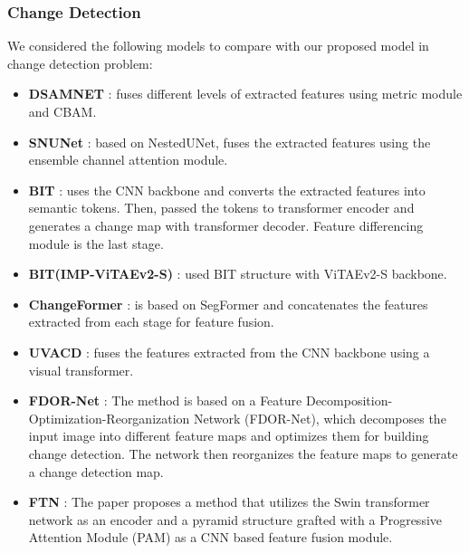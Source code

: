 \documentclass{article}
\begin{document}
\subsubsection{Change Detection}
We considered the following models to compare with our proposed model in change detection problem:
\begin{itemize}
	\item \textbf{DSAMNET} \cite{shi2021deeply}: fuses different levels of extracted features using metric module and CBAM.
	\item \textbf{SNUNet} \cite{fang2021snunet}: based on NestedUNet, fuses the extracted features using the ensemble channel attention module.
	\item \textbf{BIT} \cite{chen2021remote}: uses the CNN backbone and converts the extracted features into semantic tokens. Then, passed the tokens to transformer encoder and generates a change map with transformer decoder. Feature differencing module is the last stage.
	\item \textbf{BIT(IMP-ViTAEv2-S)} \cite{wang2022empirical} : used BIT structure with ViTAEv2-S backbone.
	\item \textbf{ChangeFormer} \cite{bandara2022transformer}: is based on SegFormer and concatenates the features extracted from each stage for feature fusion.
	\item \textbf{UVACD} \cite{wang2022network}: fuses the features extracted from the CNN backbone using a visual transformer.
	\item \textbf{FDOR-Net} \cite{ye2022feature}: The method is based on a Feature Decomposition-Optimization-Reorganization Network (FDOR-Net), which decomposes the input image into different feature maps and optimizes them for building change detection. The network then reorganizes the feature maps to generate a change detection map.
	\item \textbf{FTN} \cite{yan2022fully}: The paper proposes a method that utilizes the Swin transformer network as an encoder and a pyramid structure grafted with a Progressive Attention Module (PAM) as a CNN based feature fusion module.
\end{itemize}
\end{document}
